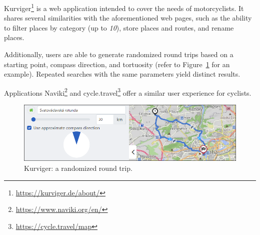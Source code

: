 Kurviger\footnote{\href{https://kurviger.de/about/}{https://kurviger.de/about/}} is a web application intended to cover the needs of motorcyclists. It shares several similarities with the aforementioned web pages, such as the ability to filter places by category (up to \emph{10}), store places and routes, and rename places.

Additionally, users are able to generate randomized round trips based on a starting point, compass direction, and tortuosity (refer to Figure~\ref{fig:kurviger-round-trip} for an example). Repeated searches with the same parameters yield distinct results.

Applications Naviki\footnote{\href{https://www.naviki.org/en/}{https://www.naviki.org/en/}} and cycle.travel\footnote{\href{https://cycle.travel/map}{https://cycle.travel/map}} offer a similar user experience for cyclists.

\begin{figure}[!h]
\centering
\includegraphics[width=\linewidth]{img/analysis/kurviger-round-trip.png}
\caption{Kurviger: a randomized round trip.}
\label{fig:kurviger-round-trip}
\end{figure}





